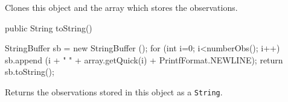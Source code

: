 \begin{tabb} Clones this object and the array which stores the observations.
\end{tabb}
\begin{code}

   public String toString()\begin{hide} {
      StringBuffer sb = new StringBuffer ();
      for (int i=0; i<numberObs(); i++)
         sb.append (i + "    " + array.getQuick(i) +
                           PrintfFormat.NEWLINE);
      return sb.toString();
   }\end{hide}
\end{code}
\begin{tabb} Returns the observations stored in this object as a \texttt{String}.
\end{tabb}
\begin{code}\begin{hide}
}\end{hide}
\end{code}
